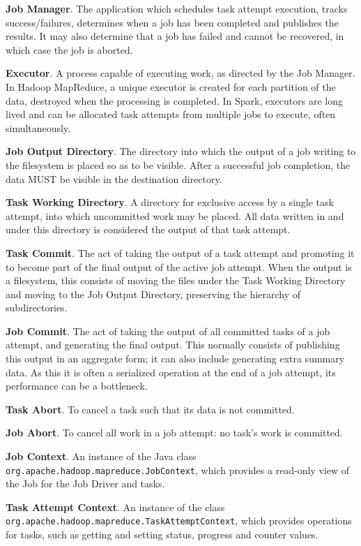 \documentclass[format=acmsmall, screen=true, nonacm, timestamp, review=false]{acmart}
\begin{document}
\textbf{Job Manager}.
The application which schedules task attempt execution, tracks success/failures,
determines when a job has been completed and publishes the results.
It may also determine that a job has failed and cannot be recovered,
in which case the job is aborted.

\textbf{Executor}.
A process capable of executing work, as directed by the Job Manager.
In Hadoop MapReduce, a unique executor is created for each partition
of the data, destroyed when the processing is completed.
In Spark, executors are long lived and can be allocated task attempts from multiple
jobs to execute, often simultaneously.

\textbf{Job Output Directory}.
The directory into which the output of a job writing to the filesystem is placed
so as to be visible.
After a successful job completion, the data MUST be visible in the destination
directory.

\textbf{Task Working Directory}.
A directory for exclusive access by a single task attempt, into which uncommitted
work may be placed.
All data written in and under this directory is considered the output of
that task attempt.


\textbf{Task Commit}.
The act of taking the output of a task attempt
and promoting it to become part of the final output of the active job
attempt.
When the output is a filesystem, this consists of moving the files
under the Task Working Directory and moving to the Job Output Directory,
preserving the hierarchy of subdirectories.


\textbf{Job Commit}.
The act of taking the output of all committed tasks of a job attempt,
and generating the final output.
This normally consists of publishing this output in an aggregate form;
it can also include generating extra summary data.
As this it is often a serialized operation at the end of a job attempt,
its performance can be a bottleneck.

\textbf{Task Abort}.
To cancel a task such that its data is not committed.

\textbf{Job Abort}.
To cancel all work in a job attempt: no task's work is committed.


\textbf{Job Context}.
An instance of the Java class \texttt{org.apache.hadoop.mapreduce.JobContext},
which provides a read-only view of the Job for the Job Driver and tasks.

\textbf{Task Attempt Context}.
An instance of the class
\texttt{org.apache.hadoop.mapreduce.TaskAttemptContext},
which provides operations for tasks, such as getting and setting status,
progress and counter values.
\end{document}
